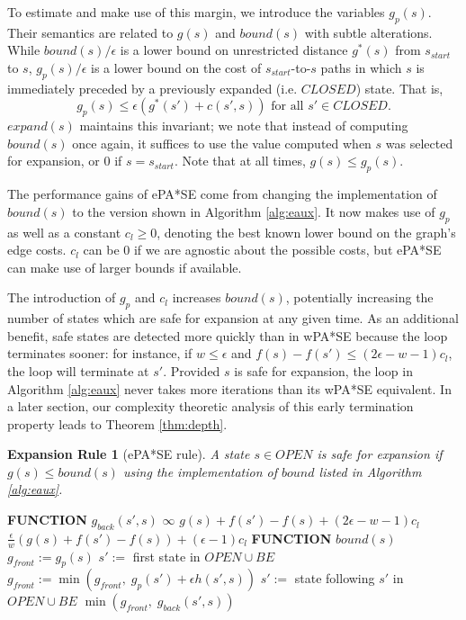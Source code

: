 \documentclass[letterpaper]{article}
\newtheorem{rul}{Expansion Rule}
\begin{document}
To estimate and make use of this margin, we introduce the variables $g_p(s)$. Their semantics are related to $g(s)$ and $bound(s)$ with subtle alterations. While $bound(s)/\epsilon$ is a lower bound on unrestricted distance $g^*(s)$ from $s_{start}$ to $s$, $g_p(s)/\epsilon$ is a lower bound on the cost of $s_{start}$-to-$s$ paths in which $s$ is immediately preceded by a previously expanded (i.e. $CLOSED$) state. That is,
\[g_p(s) \le \epsilon (g^*(s') + c(s',s))\text{ for all }s'\in CLOSED.\] $expand(s)$ maintains this invariant; we note that instead of computing $bound(s)$ once again, it suffices to use the value computed when $s$ was selected for expansion, or $0$ if $s=s_{start}$. Note that at all times, $g(s) \le g_p(s)$.

The performance gains of ePA*SE come from changing the implementation of $bound(s)$ to the version shown in Algorithm \ref{alg:eaux}. It now makes use of $g_p$ as well as a constant $c_l \ge 0$, denoting the best known lower bound on the graph's edge costs. $c_l$ can be 0 if we are agnostic about the possible costs, but ePA*SE can make use of larger bounds if available.

The introduction of $g_p$ and $c_l$ increases $bound(s)$, potentially increasing the number of states which are safe for expansion at any given time. As an additional benefit, safe states are detected more quickly than in wPA*SE because the loop terminates sooner: for instance, if $w \le \epsilon$ and $f(s) - f(s') \le (2\epsilon-w-1)c_l$, the loop will terminate at $s'$. Provided $s$ is safe for expansion, the loop in Algorithm \ref{alg:eaux} never takes more iterations than its wPA*SE equivalent. In a later section, our complexity theoretic analysis of this early termination property leads to Theorem \ref{thm:depth}.

\begin{rul}[ePA*SE rule]
A state $s\in OPEN$ is safe for expansion if $g(s) \le bound(s)$ using the implementation of $bound$ listed in Algorithm \ref{alg:eaux}.
\end{rul}

\begin{algorithm}
\caption{$bound(s)$ enhanced for ePA*SE}
\label{alg:eaux}
\begin{algorithmic}
\STATE \textbf{FUNCTION} $g_{back}(s',s)$
\RETURN $\infty$
\RETURN $g(s) + f(s') - f(s) + (2\epsilon-w-1)c_l$
\ELSE
\RETURN $\frac\epsilon w\left(g(s) + f(s') - f(s)\right) + (\epsilon-1)c_l$
\ENDIF
\STATE \textbf{FUNCTION} $bound(s)$
\STATE $g_{front} := g_p(s)$
\STATE $s' :=$ first state in $OPEN \cup BE$
\STATE $g_{front} := \min(g_{front},\;g_p(s') + \epsilon h(s',s))$
\STATE $s' :=$ state following $s'$ in $OPEN \cup BE$
\ENDWHILE
\RETURN $\min(g_{front},\;g_{back}(s',s))$
\end{algorithmic}
\end{algorithm}
\end{document}
